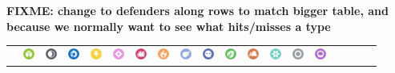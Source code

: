 \textbf{FIXME: change to defenders along rows to match bigger table, and because we normally want to see what hits/misses a type}
\begin{table}[ht]
  \begin{center}
  \setlength{\tabcolsep}{1pt}
  \begin{tabular}{c g c g c g c g c g c g c g c g c g c}
  &
  \includegraphics[width=1em]{images/bug.png} &
  \includegraphics[width=1em]{images/dark.png} &
  \includegraphics[width=1em]{images/dragon.png} &
  \includegraphics[width=1em]{images/electric.png} &
  \includegraphics[width=1em]{images/fairy.png} &
  \includegraphics[width=1em]{images/fighting.png} &
  \includegraphics[width=1em]{images/fire.png} &
  \includegraphics[width=1em]{images/flying.png} &
  \includegraphics[width=1em]{images/ghost.png} &
  \includegraphics[width=1em]{images/grass.png} &
  \includegraphics[width=1em]{images/ground.png} &
  \includegraphics[width=1em]{images/ice.png} &
  \includegraphics[width=1em]{images/normal.png} &
  \includegraphics[width=1em]{images/poison.png} &

\end{tabular}
\end{center}
\end{table}
